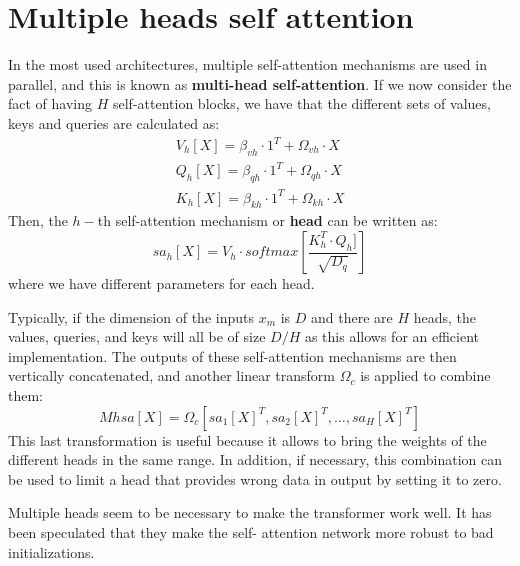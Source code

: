 \section{Multiple heads self attention}
In the most used architectures, multiple self-attention mechanisms are used in parallel, and this is known as 
\textbf{multi-head self-attention}. If we now consider the fact of having $H$ self-attention blocks, we have that the 
different sets of values, keys and queries are calculated as: 
\begin{align*}
        V_h[X] = \beta_{vh} \cdot 1^T + \Omega_{vh} \cdot X \\ 
        Q_h[X] = \beta_{qh} \cdot 1^T + \Omega_{qh} \cdot X \\
        K_h[X] = \beta_{kh} \cdot 1^T + \Omega_{kh} \cdot X
\end{align*}
Then, the $h-$th self-attention mechanism or \textbf{head} can be written as:
\begin{equation}
    sa_h[X] = V_h \cdot softmax\left[\frac{K_h^T \cdot Q_h]}{\sqrt{D_q}}\right]
\end{equation}
where we have different parameters for each head. 

Typically, if the dimension of the inputs $x_m$ is $D$ and there are $H$ heads, the values, queries, and keys will all be 
of size $D/H$ as this allows for an efficient implementation. The outputs of these self-attention mechanisms are then 
vertically concatenated, and another linear transform $\Omega_c$ is applied to combine them: 
\begin{equation}
    Mhsa[X] = \Omega_c[sa_1[X]^T, sa_2[X]^T, \dots, sa_H[X]^T]
\end{equation}
This last transformation is useful because it allows to bring the weights of the different heads in the same range. In 
addition, if necessary, this combination can be used to limit a head that provides wrong data in output by setting it to 
zero.

Multiple heads seem to be necessary to make the transformer work well. It has been speculated that they make the self-
attention network more robust to bad initializations.

